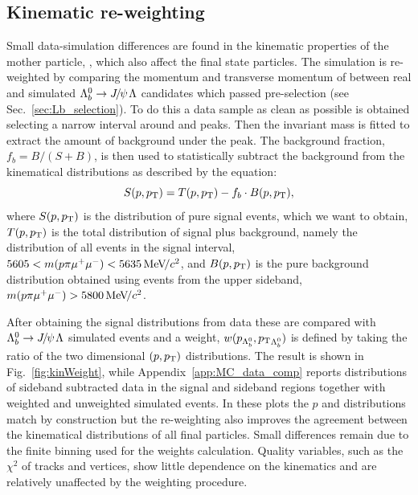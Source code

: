 \subsection{Kinematic re-weighting}
\label{sec:kinWeight}

Small data-simulation differences are found in the kinematic properties of the mother particle, \Lb,
which also affect the final state particles. The simulation is re-weighted by 
comparing the momentum and transverse momentum of \Lb between
real and simulated $\Lb\to\jpsi\Lz$ candidates which passed pre-selection (see Sec.~\ref{sec:Lb_selection}).
To do this a data sample as clean as possible is obtained selecting a narrow interval around \jpsi and \Lb peaks.
Then the \Lb invariant mass is fitted to extract the amount of background under the peak.
The background fraction, $f_b = B/(S+B)$, is then used to statistically
subtract the background from the kinematical distributions as described by the equation:
%
\begin{equation}
S(p,\mbox{$p_{\rm T}$}) = T(p,\mbox{$p_{\rm T}$}) - f_b\cdot B(p,\mbox{$p_{\rm T}$}),
\end{equation}
\noindent
where $S(p,\mbox{$p_{\rm T}$})$ is the distribution of pure signal events, which we want to obtain, $T(p,\mbox{$p_{\rm T}$})$ is the total
distribution of signal plus background, namely the distribution of all events in the signal interval,
$5605 < m(p\pi\mumu) < 5635 \mevcc$, and $B(p,\mbox{$p_{\rm T}$})$ is the pure background
distribution obtained using events from the upper sideband, $m(p\pi\mumu) > 5800 \mevcc$.

After obtaining the signal distributions from data these are compared with \mbox{$\Lb\to\jpsi\Lz$} simulated events
and a weight, $w(p_{{{\Lambda}^0_{b}}},\mbox{$p_{\rm T}$}_{{{\Lambda}^0_{b}}})$ is defined by taking the ratio of the two dimensional $(p,\mbox{$p_{\rm T}$})$ distributions.
The result is shown in Fig.~\ref{fig:kinWeight}, while Appendix~\ref{app:MC_data_comp} reports distributions
of sideband subtracted data in the signal and sideband regions together with weighted and unweighted simulated events.
In these plots the \Lb $p$ and \pt distributions match by construction but the re-weighting also improves the agreement 
between the kinematical distributions of all final particles. Small differences remain due to
the finite binning used for the weights calculation. Quality variables, such as the $\chi^2$ of tracks
and vertices, show little dependence on the kinematics and are relatively unaffected by the weighting procedure.

